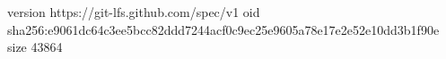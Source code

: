 version https://git-lfs.github.com/spec/v1
oid sha256:e9061dc64c3ee5bcc82ddd7244acf0c9ec25e9605a78e17e2e52e10dd3b1f90e
size 43864

